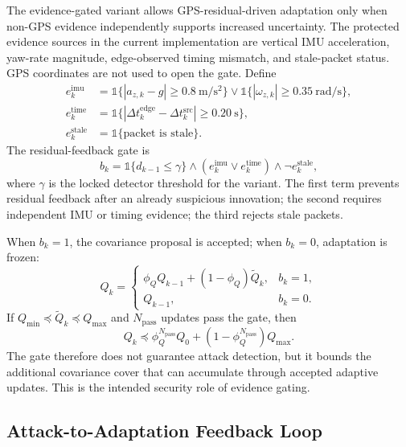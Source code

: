 \documentclass[conference]{IEEEtran}
\begin{document}
The evidence-gated variant allows GPS-residual-driven adaptation only when
non-GPS evidence independently supports increased uncertainty. The protected
evidence sources in the current implementation are vertical IMU acceleration,
yaw-rate magnitude, edge-observed timing mismatch, and stale-packet status.
GPS coordinates are not used to open the gate. Define
\begin{equation}
\begin{split}
e_k^{\mathrm{imu}} &=
\mathbb{1}\{|a_{z,k}-g|\geq 0.8\ \mathrm{m/s^2}\}
\vee
\mathbb{1}\{|\omega_{z,k}|\geq0.35\ \mathrm{rad/s}\},\\
e_k^{\mathrm{time}} &=
\mathbb{1}\{|\Delta t_k^{\mathrm{edge}}-\Delta t_k^{\mathrm{src}}|
\geq0.20\ \mathrm{s}\},\\
e_k^{\mathrm{stale}} &= \mathbb{1}\{\text{packet is stale}\}.
\end{split}
\end{equation}
The residual-feedback gate is
\begin{equation}
    b_k =
    \mathbb{1}\{d_{k-1}\leq \gamma\}
    \wedge (e_k^{\mathrm{imu}}\vee e_k^{\mathrm{time}})
    \wedge \neg e_k^{\mathrm{stale}},
\end{equation}
where $\gamma$ is the locked detector threshold for the variant. The first term
prevents residual feedback after an already suspicious innovation; the second
requires independent IMU or timing evidence; the third rejects stale packets.

When $b_k=1$, the covariance proposal is accepted; when $b_k=0$, adaptation is
frozen:
\begin{equation}
Q_k =
\begin{cases}
\phi_Q Q_{k-1} + (1-\phi_Q)\widetilde{Q}_k, & b_k=1,\\
Q_{k-1}, & b_k=0.
\end{cases}
\end{equation}
If $Q_{\min}\preceq \widetilde{Q}_k \preceq Q_{\max}$ and $N_{\mathrm{pass}}$
updates pass the gate, then
\begin{equation}
Q_k \preceq
\phi_Q^{N_{\mathrm{pass}}}Q_0+
(1-\phi_Q^{N_{\mathrm{pass}}})Q_{\max}.
\end{equation}
The gate therefore does not guarantee attack detection, but it bounds the
additional covariance cover that can accumulate through accepted adaptive
updates. This is the intended security role of evidence gating.

\subsection{Attack-to-Adaptation Feedback Loop}
\end{document}
